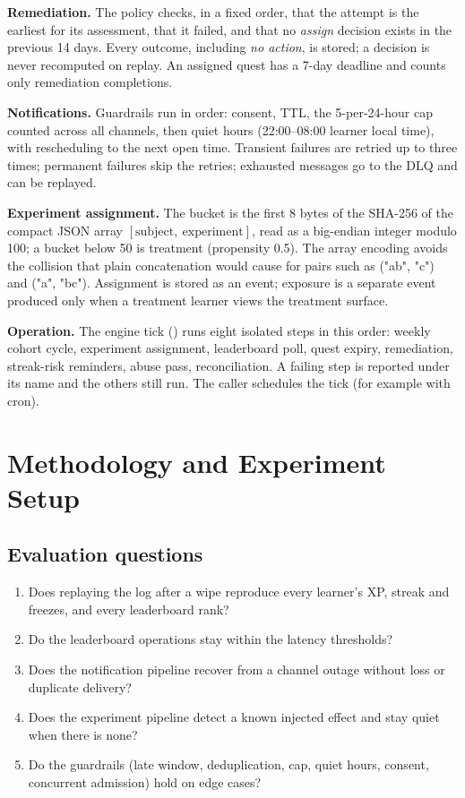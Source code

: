 \documentclass[11pt,a4paper]{article}
\renewcommand{\_}{\textunderscore\allowbreak{}}
\begin{document}
\textbf{Remediation.} The policy checks, in a fixed order, that the attempt is the earliest for its assessment, that it failed, and that no \emph{assign} decision exists in the previous 14 days. Every outcome, including \emph{no action}, is stored; a decision is never recomputed on replay. An assigned  quest has a 7-day deadline and counts only remediation completions.

\textbf{Notifications.} Guardrails run in order: consent, TTL, the 5-per-24-hour cap counted across all channels, then quiet hours (22:00--08:00 learner local time), with rescheduling to the next open time. Transient failures are retried up to three times; permanent failures skip the retries; exhausted messages go to the DLQ and can be replayed.

\textbf{Experiment assignment.} The bucket is the first 8 bytes of the SHA-256 of the compact JSON array $[\text{subject},\ \text{experiment}]$, read as a big-endian integer modulo 100; a bucket below 50 is treatment (propensity 0.5). The array encoding avoids the collision that plain concatenation would cause for pairs such as ("ab", "c") and ("a", "bc"). Assignment is stored as an event; exposure is a separate event produced only when a treatment learner views the treatment surface.

\textbf{Operation.} The engine tick () runs eight isolated steps in this order: weekly cohort cycle, experiment assignment, leaderboard poll, quest expiry, remediation, streak-risk reminders, abuse pass, reconciliation. A failing step is reported under its name and the others still run. The caller schedules the tick (for example with cron).

\section{Methodology and Experiment Setup}

\subsection{Evaluation questions}

\begin{enumerate}[label=\textbf{EQ\arabic*.}, leftmargin=2.6em]
    \item Does replaying the log after a wipe reproduce every learner's XP, streak and freezes, and every leaderboard rank?
    \item Do the leaderboard operations stay within the latency thresholds?
    \item Does the notification pipeline recover from a channel outage without loss or duplicate delivery?
    \item Does the experiment pipeline detect a known injected effect and stay quiet when there is none?
    \item Do the guardrails (late window, deduplication, cap, quiet hours, consent, concurrent admission) hold on edge cases?
\end{enumerate}
\end{document}
